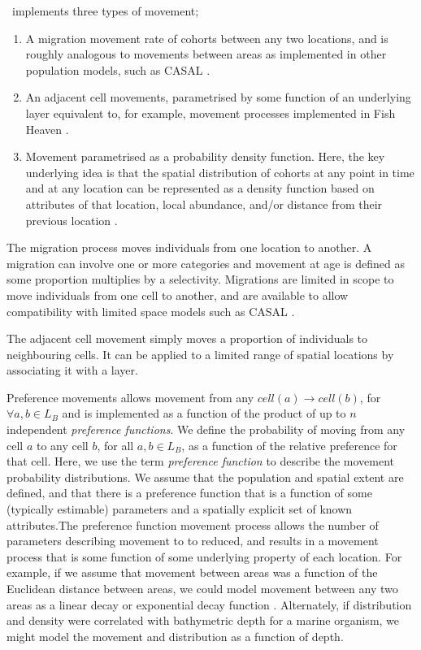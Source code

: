 \SPM\ implements three types of movement;
\begin{enumerate}
	\item  A migration movement rate of cohorts between any two locations, and is roughly analogous to movements between areas as implemented in other population models, such as CASAL \citep{1388}. 
	\item An adjacent cell movements, parametrised by some function of an underlying layer \textemdash equivalent to, for example, movement processes implemented in Fish Heaven \citep{1136,1135}.
	\item Movement parametrised as a probability density function. Here, the key underlying idea is that the spatial distribution of cohorts at any point in time and at any location can be represented as a density function based on attributes of that location, local abundance, and/or distance from their previous location \citep{1366,1367}. 
\end{enumerate}

The migration process moves individuals from one location to another. A migration can involve one or more categories and movement at age is defined as some proportion multiplies by a selectivity. Migrations are limited in scope to move individuals from one cell to another, and are available to allow compatibility with limited space models such as CASAL \cite{1388}.

The adjacent cell movement simply moves a proportion of individuals to neighbouring cells. It can be applied to a limited range of spatial locations by associating it with a layer.

Preference movements allows movement from any $cell(a) \rightarrow cell(b)$, for $\forall a,b \in L_B$ and is implemented as a function of the product of up to $n$ independent \emph{preference functions}. We define the probability of moving from any cell $a$ to any cell $b$, for all $a,b \in L_B$, as a function of the relative preference for that cell. Here, we use the term \emph{preference function} \citep{1366,1367} to describe the movement probability distributions. We assume that the population and spatial extent are defined, and that there is a preference function that is a function of some (typically estimable) parameters and a spatially explicit set of known attributes.The preference function movement process allows the number of parameters describing movement to to reduced, and results in a movement process that is some function of some underlying property of each location. For example, if we assume that movement between areas was a function of the Euclidean distance between areas, we could model movement between any two areas as a linear decay or exponential decay function \citep{1366}. Alternately, if distribution and density were correlated with bathymetric depth for a marine organism, we might model the movement and distribution as a function of depth. 

